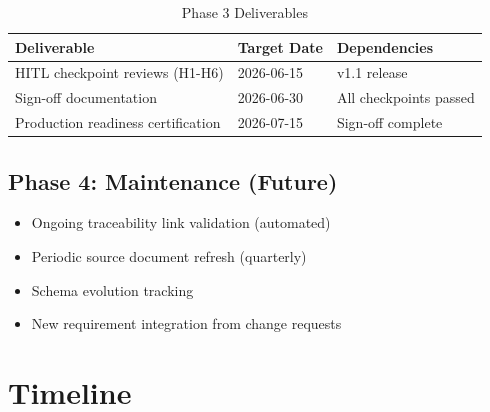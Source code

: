 \documentclass[11pt,a4paper,twoside]{report}
\begin{document}
\begin{table}[h]
\centering
\caption{Phase 3 Deliverables}
\label{tab:phase3-deliverables}
\begin{tabularx}{\textwidth}{@{}L{5cm}C{2.5cm}L{6cm}@{}}
\toprule
\textbf{Deliverable} & \textbf{Target Date} & \textbf{Dependencies} \\
\midrule
HITL checkpoint reviews (H1-H6) & 2026-06-15 & v1.1 release \\
Sign-off documentation & 2026-06-30 & All checkpoints passed \\
Production readiness certification & 2026-07-15 & Sign-off complete \\
\bottomrule
\end{tabularx}
\end{table}

\subsection{Phase 4: Maintenance (Future)}

\begin{itemize}[noitemsep]
\item Ongoing traceability link validation (automated)
\item Periodic source document refresh (quarterly)
\item Schema evolution tracking
\item New requirement integration from change requests
\end{itemize}

\section{Timeline}
\label{sec:timeline}
\end{document}
